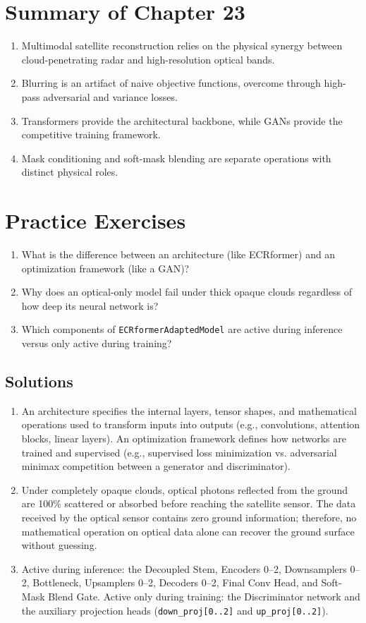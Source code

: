 \section{Summary of Chapter 23}
\begin{enumerate}
    \item Multimodal satellite reconstruction relies on the physical synergy between cloud-penetrating radar and high-resolution optical bands.
    \item Blurring is an artifact of naive objective functions, overcome through high-pass adversarial and variance losses.
    \item Transformers provide the architectural backbone, while GANs provide the competitive training framework.
    \item Mask conditioning and soft-mask blending are separate operations with distinct physical roles.
\end{enumerate}

\section{Practice Exercises}
\begin{enumerate}
    \item What is the difference between an architecture (like ECRformer) and an optimization framework (like a GAN)?
    \item Why does an optical-only model fail under thick opaque clouds regardless of how deep its neural network is?
    \item Which components of \texttt{ECRformerAdaptedModel} are active during inference versus only active during training?
\end{enumerate}

\subsection*{Solutions}
\begin{enumerate}
    \item An architecture specifies the internal layers, tensor shapes, and mathematical operations used to transform inputs into outputs (e.g., convolutions, attention blocks, linear layers). An optimization framework defines how networks are trained and supervised (e.g., supervised loss minimization vs. adversarial minimax competition between a generator and discriminator).
    \item Under completely opaque clouds, optical photons reflected from the ground are 100\% scattered or absorbed before reaching the satellite sensor. The data received by the optical sensor contains zero ground information; therefore, no mathematical operation on optical data alone can recover the ground surface without guessing.
    \item Active during inference: the Decoupled Stem, Encoders 0--2, Downsamplers 0--2, Bottleneck, Upsamplers 0--2, Decoders 0--2, Final Conv Head, and Soft-Mask Blend Gate. Active only during training: the Discriminator network and the auxiliary projection heads (\texttt{down\_proj[0..2]} and \texttt{up\_proj[0..2]}).
\end{enumerate}
